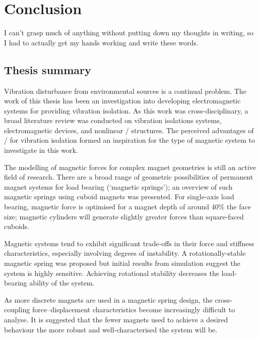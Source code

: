 \documentclass[10pt,a4paper]{memoir}
\begin{document}
\chapter{Conclusion}

\epigraph{
  I can't grasp much of anything without putting down my thoughts in writing, so I had to actually get my hands working and write these words.
}{}

\section{Thesis summary}

Vibration disturbance from environmental sources is a continual problem.
The work of this thesis has been an investigation into developing electromagnetic systems for providing vibration isolation.
As this work was cross-disciplinary, a broad literature review was conducted on vibration isolations systems, electromagnetic devices, and nonlinear \qzs/ structures.
The perceived advantages of \qzs/ for vibration isolation formed an inspiration for the type of magnetic system to investigate in this work.

The modelling of magnetic forces for complex magnet geometries is still an active field of research.
There are a broad range of geometric possibilities of permanent magnet systems for load bearing (`magnetic springs'); an overview of such magnetic springs using cuboid magnets was presented.
For single-axis load bearing, magnetic force is optimised for a magnet depth of around 40\% the face size; magnetic cylinders will generate slightly greater forces than square-faced cuboids.

Magnetic systems tend to exhibit significant trade-offs in their force and stiffness characteristics, especially involving degrees of instability.
A rotationally-stable magnetic spring was proposed but initial results from simulation suggest the system is highly sensitive.
Achieving rotational stability decreases the load-bearing ability of the system.

As more discrete magnets are used in a magnetic spring design, the cross-coupling force--displacement characteristics become increasingly difficult to analyse.
It is suggested that the fewer magnets used to achieve a desired behaviour the more robust and well-characterised the system will be.
\end{document}
